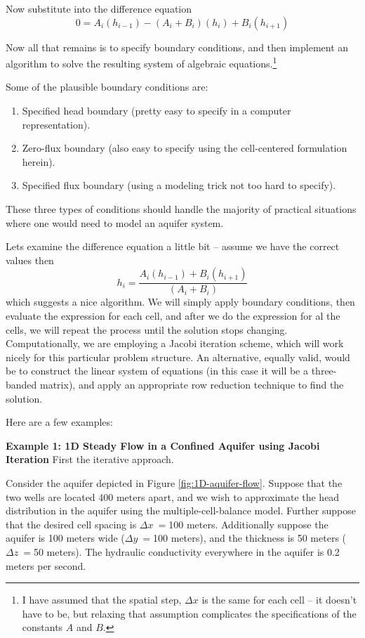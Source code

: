Now substitute into the difference equation
 \begin{equation}
0 = A_{i}(h_{i-1}) -(A_{i}+B_{i})(h_{i}) + B_{i}(h_{i+1})
\end{equation}

Now all that remains is to specify boundary conditions, and then implement an algorithm to solve the resulting system of algebraic equations.\footnote{I have assumed that the spatial step, $\Delta x$ is the same for each cell -- it doesn't have to be, but relaxing that assumption complicates the specifications of the constants $A$ and $B$.}

Some of the plausible boundary conditions are:
\begin{enumerate}
\item Specified head boundary (pretty easy to specify in a computer representation).
\item Zero-flux boundary (also easy to specify using the cell-centered formulation herein).
\item Specified flux boundary (using a modeling trick not too hard to specify).
\end{enumerate}
These three types of conditions should handle the majority of practical situations where one would need to model an aquifer system.

Lets examine the difference equation a little bit -- assume we have the correct values then
\begin{equation}
h_{i} = \frac{A_{i}(h_{i-1}) + B_{i}(h_{i+1})}{(A_{i}+B_{i})}
\end{equation}
which suggests a nice algorithm.  
We will simply apply boundary conditions, then evaluate the expression for each cell, and after we do the expression for al the cells, we will repeat the process until the solution stops changing.  
Computationally, we are employing a Jacobi iteration scheme, which will work nicely for this particular problem structure.  
An alternative, equally valid, would be to construct the linear system of equations (in this case it will be a three-banded matrix), and apply an appropriate row reduction technique to find the solution. 

Here are a few examples:

\textbf{Example 1: 1D Steady Flow in a Confined Aquifer using Jacobi Iteration}
First the iterative approach.

Consider the aquifer depicted in Figure \ref{fig:1D-aquifer-flow}.  Suppose that the two wells are located 400 meters apart, and we wish to approximate the head distribution in the aquifer using the multiple-cell-balance model.  Further suppose that the desired cell spacing is $\Delta x~=$100 meters.  Additionally suppose the aquifer is 100 meters wide ($\Delta y~=$100 meters), and the thickness is 50 meters ($\Delta z~=$50 meters).  The hydraulic conductivity everywhere in the aquifer is 0.2 meters per second.  



